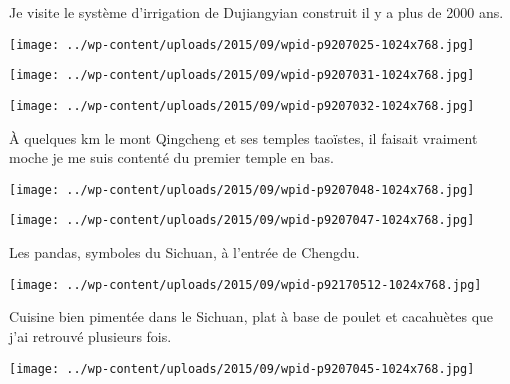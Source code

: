  Je visite le système d'irrigation de Dujiangyian construit il y a plus de 2000 ans. 
\begin{center} \texttt{[image: ../wp-content/uploads/2015/09/wpid-p9207025-1024x768.jpg]} \end{center}
\begin{center} \texttt{[image: ../wp-content/uploads/2015/09/wpid-p9207031-1024x768.jpg]} \end{center}
\begin{center} \texttt{[image: ../wp-content/uploads/2015/09/wpid-p9207032-1024x768.jpg]} \end{center}

 \`A quelques km le mont Qingcheng et ses temples taoïstes, il faisait vraiment moche je me suis contenté du premier temple en bas. 
\begin{center} \texttt{[image: ../wp-content/uploads/2015/09/wpid-p9207048-1024x768.jpg]} \end{center}
\begin{center} \texttt{[image: ../wp-content/uploads/2015/09/wpid-p9207047-1024x768.jpg]} \end{center}

 Les pandas, symboles du Sichuan, à l'entrée de Chengdu. 
\begin{center} \texttt{[image: ../wp-content/uploads/2015/09/wpid-p92170512-1024x768.jpg]} \end{center}
\vspace{-\topsep}
\pagebreak

 Cuisine bien pimentée dans le Sichuan, plat à base de poulet et cacahuètes que j'ai retrouvé plusieurs fois. 
\begin{center} \texttt{[image: ../wp-content/uploads/2015/09/wpid-p9207045-1024x768.jpg]} \end{center}
